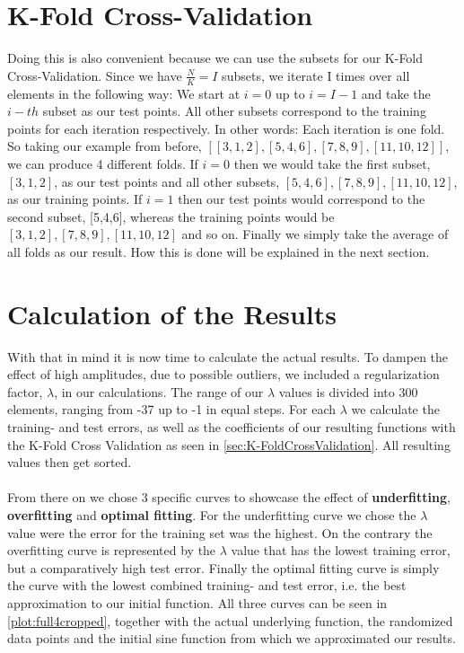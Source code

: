 \documentclass{article}
\begin{document}
\section{K-Fold Cross-Validation}
\label{sec:K-FoldCrossValidation}
Doing this is also convenient because we can use the subsets for our K-Fold Cross-Validation. Since we have $\frac{N}{K} = I$ subsets, we iterate I times over all elements in the following way: We start at $i = 0$ up to $i = I-1$ and take the $i-th$ subset as our test points. All other subsets correspond to the training points for each iteration respectively. In other words: Each iteration is one fold. So taking our example from before, $[[3,1,2],[5,4,6],[7,8,9],[11,10,12]]$, we can produce 4 different folds. If $i = 0$ then we would take the first subset, $[3,1,2]$, as our test points and all other subsets, $[5,4,6],[7,8,9],[11,10,12]$, as our training points. If $i = 1$ then our test points would correspond to the second subset, [5,4,6], whereas the training points would be $[3,1,2],[7,8,9],[11,10,12]$ and so on. Finally we simply take the average of all folds as our result. How this is done will be explained in the next section. 


\section{Calculation of the Results}
\label{sec:CalculateTheResults}
With that in mind it is now time to calculate the actual results. To dampen the effect of high amplitudes, due to possible outliers, we included a regularization factor, $\lambda$, in our calculations. The range of our $\lambda$ values is divided into 300 elements, ranging from -37 up to -1 in equal steps. For each $\lambda$ we calculate the training- and test errors, as well as the coefficients of our resulting functions with the K-Fold Cross Validation as seen in \autoref{sec:K-FoldCrossValidation}. All resulting values then get sorted. \\
\\
From there on we chose 3 specific curves to showcase the effect of \textbf{underfitting}, \textbf{overfitting} and \textbf{optimal fitting}. For the underfitting curve we chose the $\lambda$ value were the error for the training set was the highest. On the contrary the overfitting curve is represented by the $\lambda$ value that has the lowest training error, but a comparatively high test error. Finally the optimal fitting curve is simply the curve with the lowest combined training- and test error, i.e. the best approximation to our initial function. All three curves can be seen in \autoref{plot:full4cropped}, together with the actual underlying function, the randomized data points and the initial sine function from which we approximated our results.  
\end{document}
